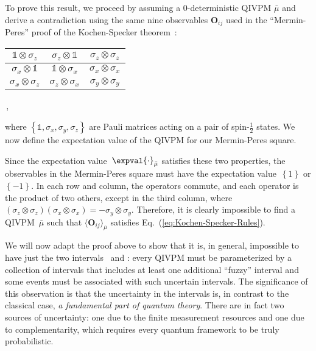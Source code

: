 \documentclass[english,reprint, aps, prl,superscriptaddress, showpacs,
showkeys, longbibliography, amsmath, amssymb]{revtex4-1}
\theoremstyle{plain}
\theoremstyle{definition}
\newcommand{\imposs}{{\text{\wesa{impossible}}}}
\newcommand{\necess}{{\text{\wesa{certain}}}}
\begin{document}
To prove this result, we proceed by assuming a 0-deterministic QIVPM
$\bar{\mu}$ and derive a contradiction using the same nine observables
$\mathbf{O}_{ij}$ used in the ``Mermin-Peres'' proof of the
Kochen-Specker theorem~\cite{Mermin1990Simple,peres1995quantum}:
{\renewcommand{\arraystretch}{2}%
\begin{center}
\begin{tabular}{|@{\quad}c@{\quad}|@{\quad}c@{\quad}|@{\quad}c@{\quad}|}
\hline 
$\mathbb{1}\otimes\sigma_{z}$  & $\sigma_{z}\otimes\mathbb{1}$  & $\sigma_{z}\otimes\sigma_{z}$ \tabularnewline
\hline 
$\sigma_{x}\otimes\mathbb{1}$  & $\mathbb{1}\otimes\sigma_{x}$  & $\sigma_{x}\otimes\sigma_{x}$ \tabularnewline
\hline 
$\sigma_{x}\otimes\sigma_{z}$  & $\sigma_{z}\otimes\sigma_{x}$  & $\sigma_{y}\otimes\sigma_{y}$ \tabularnewline
\hline 
\end{tabular}\,,
\par\end{center}
}
\noindent where $\left\{\mathbb{1},\sigma_{x},\sigma_{y},\sigma_{z}\right\}$ are
Pauli matrices acting on a pair of spin-$\frac{1}{2}$ states. We now define the
expectation value of the QIVPM for our Mermin-Peres square.

Since the expectation value~$\expval{\cdot}_{\bar{\mu}}$ satisfies
these two properties, the observables in the Mermin-Peres square must
have the expectation value~$\left\{ 1\right\} $ or
$\left\{ -1\right\} $.  In each row and column, the operators commute,
and each operator is the product of two others, except in the third
column, where
$\left(\sigma_{z}\otimes\sigma_{z}\right)\left(\sigma_{x}\otimes\sigma_{x}\right)=-\sigma_{y}\otimes\sigma_{y}$.
Therefore, it is clearly impossible to find a QIVPM~$\bar{\mu}$ such
that $\langle \mathbf{O}_{ij}\rangle_{\bar \mu}$ satisfies
Eq.~(\ref{eq:Kochen-Specker-Rules}).
 
We will now adapt the proof above to show that it is, in general,
impossible to have just the two intervals \imposs\ and \necess: every
QIVPM must be parameterized by a collection of intervals that includes
at least one additional ``fuzzy'' interval and some events must be
associated with such uncertain intervals. The significance of this
observation is that the uncertainty in the intervals is, in contrast
to the classical case, \emph{a fundamental part of quantum
  theory}. There are in fact two sources of uncertainty: one due to
the finite measurement resources and one due to complementarity, which
requires every quantum framework to be truly probabilistic.
\end{document}
